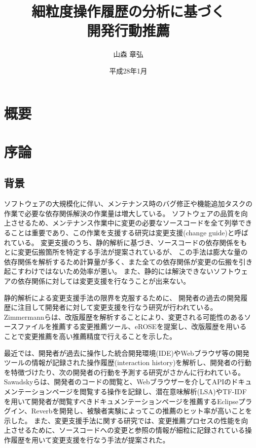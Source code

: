 \documentclass[a4paper]{jsbook}
\title{細粒度操作履歴の分析に基づく\\開発行動推薦}
\author{山森 章弘}
\date{平成28年1月}
\affiliation{大学院情報理工学研究科 計算工学専攻}
\begin{document}
\frontmatter
\maketitle

\chapter*{概要}


\tableofcontents
\listoffigures
\listoftables

\mainmatter

\chapter{序論}
\section{背景}
ソフトウェアの大規模化に伴い、メンテナンス時のバグ修正や機能追加タスクの作業で必要な依存関係解決の作業量は増大している。
ソフトウェアの品質を向上させるため、メンテナンス作業中に変更の必要なソースコードを全て列挙できることは重要であり、この作業を支援する研究は変更支援(change guide)と呼ばれている。
変更支援のうち、静的解析に基づき、ソースコードの依存関係をもとに変更伝搬箇所を特定する手法\cite{792645}が提案されているが、
この手法は膨大な量の依存関係を解析するため計算量が多く、また全ての依存関係が変更の伝搬を引き起こすわけではないため効率が悪い\cite{Geipel:2009}。
また、静的には解決できないソフトウェアの依存関係に対しては変更支援を行なうことが出来ない\cite{5609732}。

静的解析による変更支援手法の限界を克服するために、
開発者の過去の開発履歴に注目して開発者に対して変更支援を行なう研究が行われている\cite{738508, Kagdi:2006}。
Zimmermannらは、改版履歴を解析することにより、変更される可能性のあるソースファイルを推薦する変更推薦ツール、eROSE\cite{Zimmermann:2005}を提案し、改版履歴を用いることで変更推薦を高い推薦精度で行えることを示した。

最近では、開発者が過去に操作した統合開発環境(IDE)やWebブラウザ等の開発ツールの情報が記録された操作履歴(interaction history)\cite{rsse:2014}を解析し、開発者の行動を特徴づけたり、次の開発者の行動を予測する研究がさかんに行われている。
Sawadskyら\cite{Sawadsky:2013}は、開発者のコードの閲覧と、Webブラウザーを介してAPIのドキュメンテーションページを閲覧する操作を記録し、潜在意味解析(LSA)やTF-IDFを用いて開発者が閲覧すべきドキュメンテーションページを推薦するEclipseプラグイン、Reverbを開発し、被験者実験によってこの推薦のヒット率が高いことを示した。
また、変更支援手法に関する研究\cite{6233415,KatoJapanese:2011,ss2012-76,ss2013-84,Yamamori:2016}では、変更推薦プロセスの性能を向上させるために、ソースコードへの変更と参照の情報が細粒に記録されている操作履歴を用いて変更支援を行なう手法が提案された。
\end{document}
